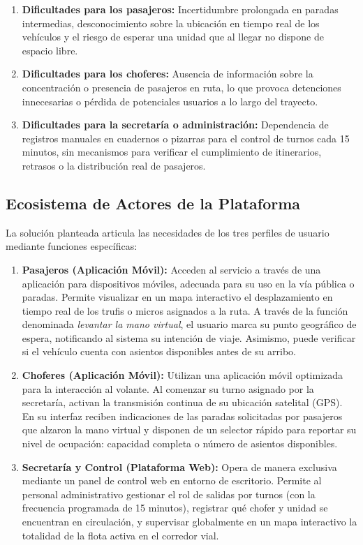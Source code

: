 \begin{enumerate}[label=\alph*)]
    \item \textbf{Dificultades para los pasajeros:} Incertidumbre prolongada en paradas intermedias, desconocimiento sobre la ubicación en tiempo real de los vehículos y el riesgo de esperar una unidad que al llegar no dispone de espacio libre.
    \item \textbf{Dificultades para los choferes:} Ausencia de información sobre la concentración o presencia de pasajeros en ruta, lo que provoca detenciones innecesarias o pérdida de potenciales usuarios a lo largo del trayecto.
    \item \textbf{Dificultades para la secretaría o administración:} Dependencia de registros manuales en cuadernos o pizarras para el control de turnos cada 15 minutos, sin mecanismos para verificar el cumplimiento de itinerarios, retrasos o la distribución real de pasajeros.
\end{enumerate}

\subsection{Ecosistema de Actores de la Plataforma}

La solución planteada articula las necesidades de los tres perfiles de usuario mediante funciones específicas:

\begin{enumerate}
    \item \textbf{Pasajeros (Aplicación Móvil):} Acceden al servicio a través de una aplicación para dispositivos móviles, adecuada para su uso en la vía pública o paradas. Permite visualizar en un mapa interactivo el desplazamiento en tiempo real de los trufis o micros asignados a la ruta. A través de la función denominada \emph{levantar la mano virtual}, el usuario marca su punto geográfico de espera, notificando al sistema su intención de viaje. Asimismo, puede verificar si el vehículo cuenta con asientos disponibles antes de su arribo.
    \item \textbf{Choferes (Aplicación Móvil):} Utilizan una aplicación móvil optimizada para la interacción al volante. Al comenzar su turno asignado por la secretaría, activan la transmisión continua de su ubicación satelital (GPS). En su interfaz reciben indicaciones de las paradas solicitadas por pasajeros que alzaron la mano virtual y disponen de un selector rápido para reportar su nivel de ocupación: capacidad completa o número de asientos disponibles.
    \item \textbf{Secretaría y Control (Plataforma Web):} Opera de manera exclusiva mediante un panel de control web en entorno de escritorio. Permite al personal administrativo gestionar el rol de salidas por turnos (con la frecuencia programada de 15 minutos), registrar qué chofer y unidad se encuentran en circulación, y supervisar globalmente en un mapa interactivo la totalidad de la flota activa en el corredor vial.
\end{enumerate}


